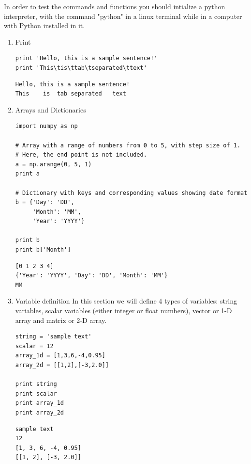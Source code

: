 \documentclass[11pt]{article}
\begin{document}
In order to test the commands and functions you should intialize a python interpreter, with the command "python" in a linux terminal while in a computer with Python installed in it.
\begin{enumerate}
\item Print
\label{sec:org8ce4300}
\begin{verbatim}
print 'Hello, this is a sample sentence!'
print 'This\tis\ttab\tseparated\ttext'
\end{verbatim}

\begin{verbatim}
Hello, this is a sample sentence!
This	is	tab	separated	text
\end{verbatim}

\item Arrays and Dictionaries
\label{sec:orga88eda0}
\begin{verbatim}
import numpy as np

# Array with a range of numbers from 0 to 5, with step size of 1.
# Here, the end point is not included.
a = np.arange(0, 5, 1)
print a

# Dictionary with keys and corresponding values showing date format
b = {'Day': 'DD',
     'Month': 'MM',
     'Year': 'YYYY'}

print b
print b['Month']
\end{verbatim}

\begin{verbatim}
[0 1 2 3 4]
{'Year': 'YYYY', 'Day': 'DD', 'Month': 'MM'}
MM
\end{verbatim}

\item Variable definition
\label{sec:org6450d5d}
In this section we will define 4 types of variables: string variables, scalar variables (either integer or float numbers), vector or 1-D array and matrix or 2-D array.
\begin{verbatim}
string = 'sample text'
scalar = 12
array_1d = [1,3,6,-4,0.95]
array_2d = [[1,2],[-3,2.0]]

print string 
print scalar
print array_1d
print array_2d
\end{verbatim}

\begin{verbatim}
sample text
12
[1, 3, 6, -4, 0.95]
[[1, 2], [-3, 2.0]]
\end{verbatim}
\end{enumerate}
\end{document}
